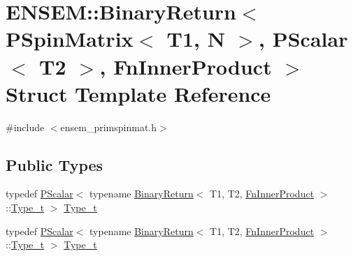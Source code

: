 \hypertarget{structENSEM_1_1BinaryReturn_3_01PSpinMatrix_3_01T1_00_01N_01_4_00_01PScalar_3_01T2_01_4_00_01FnInnerProduct_01_4}{}\section{E\+N\+S\+EM\+:\+:Binary\+Return$<$ P\+Spin\+Matrix$<$ T1, N $>$, P\+Scalar$<$ T2 $>$, Fn\+Inner\+Product $>$ Struct Template Reference}
\label{structENSEM_1_1BinaryReturn_3_01PSpinMatrix_3_01T1_00_01N_01_4_00_01PScalar_3_01T2_01_4_00_01FnInnerProduct_01_4}


{\ttfamily \#include $<$ensem\+\_\+primspinmat.\+h$>$}

\subsection*{Public Types}
\begin{DoxyCompactItemize}
\item 
typedef \mbox{\hyperlink{classENSEM_1_1PScalar}{P\+Scalar}}$<$ typename \mbox{\hyperlink{structENSEM_1_1BinaryReturn}{Binary\+Return}}$<$ T1, T2, \mbox{\hyperlink{structENSEM_1_1FnInnerProduct}{Fn\+Inner\+Product}} $>$\+::\mbox{\hyperlink{structENSEM_1_1BinaryReturn_3_01PSpinMatrix_3_01T1_00_01N_01_4_00_01PScalar_3_01T2_01_4_00_01FnInnerProduct_01_4_a8e05175a101de1a37766b92365e8612a}{Type\+\_\+t}} $>$ \mbox{\hyperlink{structENSEM_1_1BinaryReturn_3_01PSpinMatrix_3_01T1_00_01N_01_4_00_01PScalar_3_01T2_01_4_00_01FnInnerProduct_01_4_a8e05175a101de1a37766b92365e8612a}{Type\+\_\+t}}
\item 
typedef \mbox{\hyperlink{classENSEM_1_1PScalar}{P\+Scalar}}$<$ typename \mbox{\hyperlink{structENSEM_1_1BinaryReturn}{Binary\+Return}}$<$ T1, T2, \mbox{\hyperlink{structENSEM_1_1FnInnerProduct}{Fn\+Inner\+Product}} $>$\+::\mbox{\hyperlink{structENSEM_1_1BinaryReturn_3_01PSpinMatrix_3_01T1_00_01N_01_4_00_01PScalar_3_01T2_01_4_00_01FnInnerProduct_01_4_a8e05175a101de1a37766b92365e8612a}{Type\+\_\+t}} $>$ \mbox{\hyperlink{structENSEM_1_1BinaryReturn_3_01PSpinMatrix_3_01T1_00_01N_01_4_00_01PScalar_3_01T2_01_4_00_01FnInnerProduct_01_4_a8e05175a101de1a37766b92365e8612a}{Type\+\_\+t}}
\end{DoxyCompactItemize}



